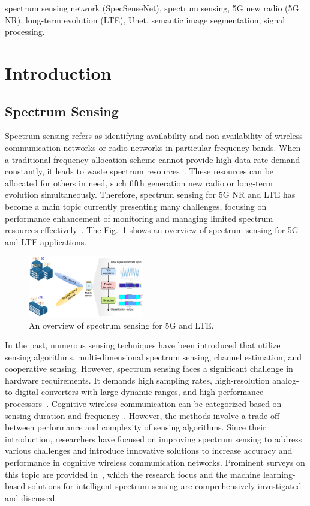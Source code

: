 \documentclass[conference]{IEEEtran} %
\begin{document}
\begin{IEEEkeywords}
    spectrum sensing network (SpecSenseNet), spectrum sensing, 5G new radio (5G NR), long-term evolution (LTE), Unet, semantic image segmentation, signal processing.
\end{IEEEkeywords}

\section{Introduction}
\subsection{Spectrum Sensing}
Spectrum sensing refers as identifying availability and non-availability of wireless communication networks or radio networks in particular frequency bands. When a traditional frequency allocation scheme cannot provide high data rate demand constantly, it leads to waste spectrum resources~\cite{huynh2021automaticsurvey}. These resources can be allocated for others in need, such fifth generation new radio or long-term evolution simultaneously. Therefore, spectrum sensing for 5G NR and LTE has become a main topic currently presenting many challenges, focusing on performance enhancement of monitoring and managing limited spectrum resources effectively~\cite{huynh2024wavenet}. The Fig.~\ref{fig1} shows an overview of spectrum sensing for 5G and LTE applications.

\begin{figure}[!ht]
    \centering
    \includegraphics[width=0.45\textwidth]{img/Design-Overview.pdf}
    \caption{An overview of spectrum sensing for 5G and LTE.}
    \label{fig1}
\end{figure}

In the past, numerous sensing techniques have been introduced that utilize sensing algorithms, multi-dimensional spectrum sensing, channel estimation, and cooperative sensing. However, spectrum sensing faces a significant challenge in hardware requirements. It demands high sampling rates, high-resolution analog-to-digital converters with large dynamic ranges, and high-performance processors~\cite{YucekSpectrumSensing}. Cognitive wireless communication can be categorized based on sensing duration and frequency~\cite{kumar2024analysis}. However, the methods involve a trade-off between performance and complexity of sensing algorithms. Since their introduction, researchers have focused on improving spectrum sensing to address various challenges and introduce innovative solutions to increase accuracy and performance in cognitive wireless communication networks. Prominent surveys on this topic are provided in~\cite{ali2016advances, liyanaarachchi2021optimized}, which the research focus and the machine learning-based solutions for intelligent spectrum sensing are comprehensively investigated and discussed.
\end{document}
